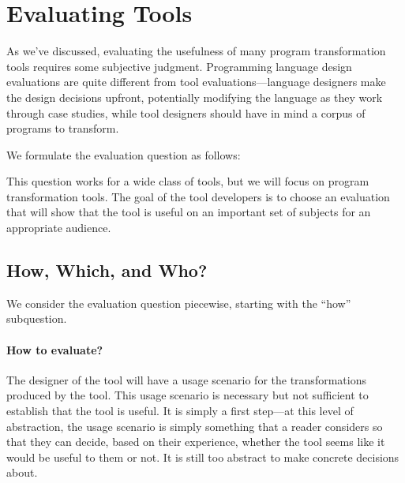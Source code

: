 \section{Evaluating Tools}
\label{sec:how-to-evaluate}
As we've discussed, evaluating the usefulness of many program
transformation tools requires some subjective judgment. 
Programming language design evaluations are
quite different from tool evaluations---language designers make
the design decisions upfront, potentially modifying the language
as they work through case studies, while tool designers should have
in mind a corpus of programs to transform.

We formulate the evaluation question as follows:
\begin{center}
\end{center}
This question works for a wide class of tools, but we will focus on program
transformation tools. The goal of the tool developers is to choose
an evaluation that will show that the tool is useful on an important
set of subjects for an appropriate audience.

\subsection{How, Which, and Who?}
We consider the evaluation question piecewise, starting with the ``how'' subquestion.

\paragraph{How to evaluate?} The designer of the tool will have a usage scenario for the
transformations produced by the tool. This usage scenario is necessary
but not sufficient to establish that the tool is useful. It is simply
a first step---at this level of abstraction, the usage scenario is
simply something that a reader considers so that they can decide,
based on their experience, whether the tool seems like it would be
useful to them or not.  It is still too abstract to make concrete
decisions about.

